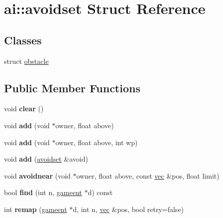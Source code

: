 \hypertarget{structai_1_1avoidset}{}\section{ai\+:\+:avoidset Struct Reference}
\label{structai_1_1avoidset}
\subsection*{Classes}
\begin{DoxyCompactItemize}
\item 
struct \hyperlink{structai_1_1avoidset_1_1obstacle}{obstacle}
\end{DoxyCompactItemize}
\subsection*{Public Member Functions}
\begin{DoxyCompactItemize}
\item 
\mbox{\label{structai_1_1avoidset_a4b69381cb42e34987637b2ace3b68bc1}} 
void {\bfseries clear} ()
\item 
\mbox{\label{structai_1_1avoidset_a7ea66f6b47371c329b97edc8258a5d73}} 
void {\bfseries add} (void $\ast$owner, float above)
\item 
\mbox{\label{structai_1_1avoidset_a9c3c99268fdf550b4a4041a88ecd43cd}} 
void {\bfseries add} (void $\ast$owner, float above, int wp)
\item 
\mbox{\label{structai_1_1avoidset_ae245f312113d4e1f55dfa661b901e5c8}} 
void {\bfseries add} (\hyperlink{structai_1_1avoidset}{avoidset} \&avoid)
\item 
\mbox{\label{structai_1_1avoidset_a2ff0b9f52e4836ad97ef4662cf8302a0}} 
void {\bfseries avoidnear} (void $\ast$owner, float above, const \hyperlink{structvec}{vec} \&pos, float limit)
\item 
\mbox{\label{structai_1_1avoidset_a7dadaef2be8e4e36f1f91251fee29245}} 
bool {\bfseries find} (int n, \hyperlink{structgameent}{gameent} $\ast$d) const
\item 
\mbox{\label{structai_1_1avoidset_abce9d6126c6485abbe312c2c2c8f4792}} 
int {\bfseries remap} (\hyperlink{structgameent}{gameent} $\ast$d, int n, \hyperlink{structvec}{vec} \&pos, bool retry=false)
\end{DoxyCompactItemize}
